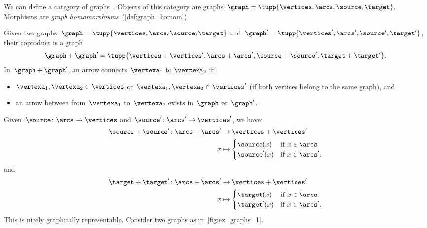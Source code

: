 \begin{example}
    \label{def:ex_graph}
    \index{\Graph}
    We can define a category of graphs~\Graph.
    Objects of this category are graphs~$\graph=\tupp{\vertices,\arcs,\source,\target}$.
    Morphisms are \emph{graph homomorphisms}~(\cref{def:graph_homom})

    Given two graphs~$\graph=\tupp{\vertices,\arcs,\source,\target}$ and~$\graph'=\tupp{\vertices',\arcs',\source',\target'}$, their coproduct is a graph
    \begin{equation*}
        \graph+\graph'=\tupp{\vertices+\vertices',\arcs+\arcs',\source+\source',\target+\target'}.
    \end{equation*}
    In~$\graph+\graph'$, an arrow connects~$\vertexa_1$ to $\vertexa_2$ if:
    \begin{itemize}
        \item $\vertexa_1,\vertexa_2\in \vertices$ or~$\vertexa_1,\vertexa_2\in \vertices'$ (if both vertices belong to the same graph), and
        \item an arrow between from~$\vertexa_1$ to~$\vertexa_2$ exists in~$\graph$ or~$\graph'$.
    \end{itemize}
    Given~$\source \colon \arcs \to \vertices$ and~$\source'\colon \arcs'\to \vertices'$, we have:
    \begin{equation*}
        \begin{aligned}
            \source+ \source'\colon \arcs+ \arcs' & \to \vertices+ \vertices' \\
            x                                     & \mapsto
            \begin{cases}
                \source(x)  & \text{if } x\in \arcs   \\
                \source'(x) & \text{if } x\in \arcs'.
            \end{cases}
        \end{aligned}
    \end{equation*}
    and
    \begin{equation*}
        \begin{aligned}
            \target+\target '\colon \arcs+ \arcs ' & \to \vertices+ \vertices' \\
            x                                      & \mapsto
            \begin{cases}
                \target(x)  & \text{if } x\in \arcs   \\
                \target'(x) & \text{if } x\in \arcs'.
            \end{cases}
        \end{aligned}
    \end{equation*}
    This is nicely graphically representable.
    Consider two graphs as in~\cref{fig:ex_graphs_1}.


\end{example}

